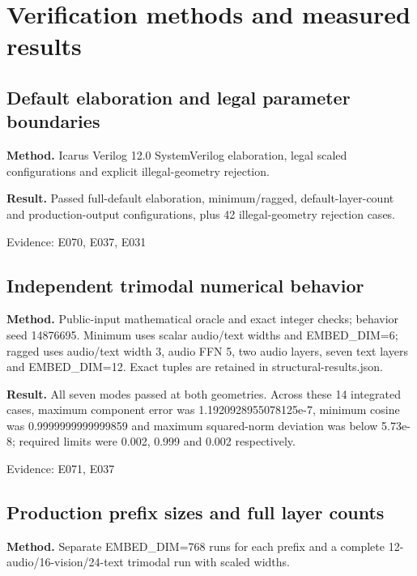 \documentclass[11pt,a4paper]{article}
\begin{document}
\section{Verification methods and measured results}

\subsection{Default elaboration and legal parameter boundaries}

\textbf{Method.} Icarus Verilog 12.0 SystemVerilog elaboration,\allowbreak{} legal scaled configurations and explicit illegal-geometry rejection.

\textbf{Result.} Passed full-default elaboration,\allowbreak{} minimum/\allowbreak{}ragged,\allowbreak{} default-layer-count and production-output configurations,\allowbreak{} plus 42 illegal-geometry rejection cases.

{\small Evidence: E070,\allowbreak{} E037,\allowbreak{} E031}

\subsection{Independent trimodal numerical behavior}

\textbf{Method.} Public-input mathematical oracle and exact integer checks; behavior seed 14876695. Minimum uses scalar audio/\allowbreak{}text widths and EMBED\_\allowbreak{}DIM=\allowbreak{}6; ragged uses audio/\allowbreak{}text width 3,\allowbreak{} audio FFN 5,\allowbreak{} two audio layers,\allowbreak{} seven text layers and EMBED\_\allowbreak{}DIM=\allowbreak{}12. Exact tuples are retained in structural-results.json.

\textbf{Result.} All seven modes passed at both geometries. Across these 14 integrated cases,\allowbreak{} maximum component error was 1.1920928955078125e-7,\allowbreak{} minimum cosine was 0.9999999999999859 and maximum squared-norm deviation was below 5.73e-8; required limits were 0.002,\allowbreak{} 0.999 and 0.002 respectively.

{\small Evidence: E071,\allowbreak{} E037}

\subsection{Production prefix sizes and full layer counts}

\textbf{Method.} Separate EMBED\_\allowbreak{}DIM=\allowbreak{}768 runs for each prefix and a complete 12-audio/\allowbreak{}16-vision/\allowbreak{}24-text trimodal run with scaled widths.
\end{document}
